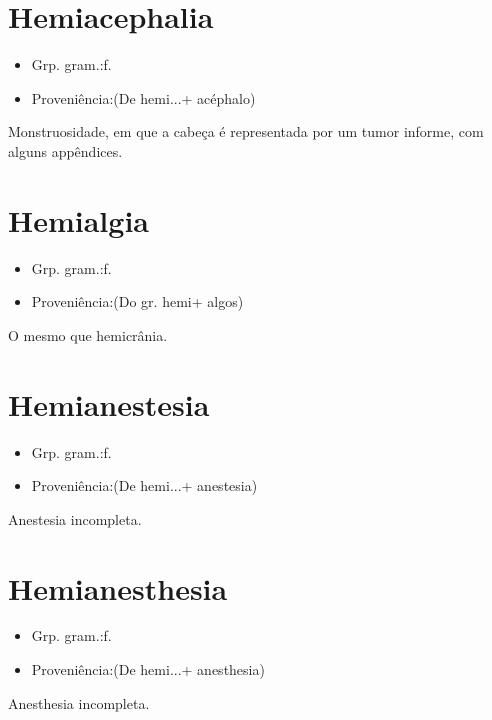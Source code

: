 \documentclass{article}
\begin{document}
\section{Hemiacephalia}
\begin{itemize}
\item {Grp. gram.:f.}
\end{itemize}
\begin{itemize}
\item {Proveniência:(De \textunderscore hemi...\textunderscore  + \textunderscore acéphalo\textunderscore )}
\end{itemize}
Monstruosidade, em que a cabeça é representada por um tumor informe, com alguns appêndices.
\section{Hemialgia}
\begin{itemize}
\item {Grp. gram.:f.}
\end{itemize}
\begin{itemize}
\item {Proveniência:(Do gr. \textunderscore hemi\textunderscore  + \textunderscore algos\textunderscore )}
\end{itemize}
O mesmo que \textunderscore hemicrânia\textunderscore .
\section{Hemianestesia}
\begin{itemize}
\item {Grp. gram.:f.}
\end{itemize}
\begin{itemize}
\item {Proveniência:(De \textunderscore hemi...\textunderscore  + \textunderscore anestesia\textunderscore )}
\end{itemize}
Anestesia incompleta.
\section{Hemianesthesia}
\begin{itemize}
\item {Grp. gram.:f.}
\end{itemize}
\begin{itemize}
\item {Proveniência:(De \textunderscore hemi...\textunderscore  + \textunderscore anesthesia\textunderscore )}
\end{itemize}
Anesthesia incompleta.
\end{document}
